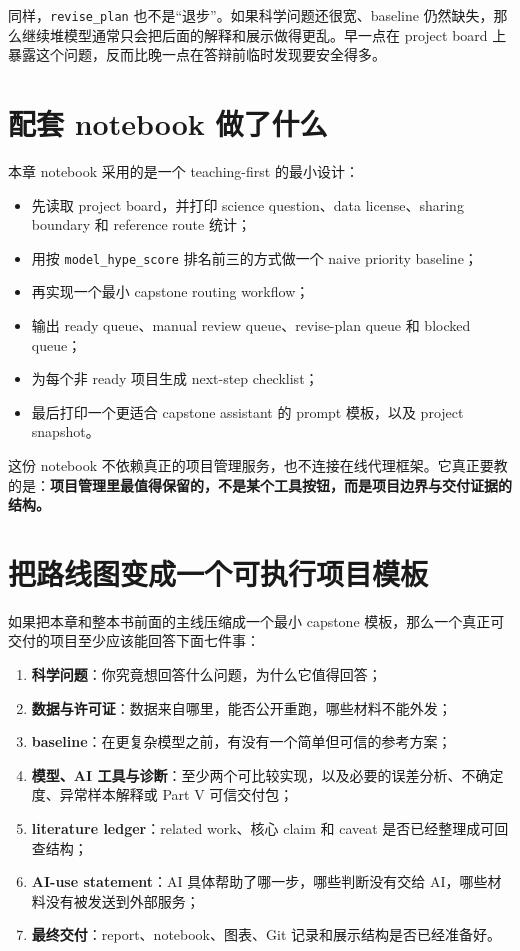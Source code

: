 同样，\texttt{revise\_plan} 也不是“退步”。如果科学问题还很宽、baseline 仍然缺失，那么继续堆模型通常只会把后面的解释和展示做得更乱。早一点在 project board 上暴露这个问题，反而比晚一点在答辩前临时发现要安全得多。

\section{配套 notebook 做了什么}

本章 notebook 采用的是一个 teaching-first 的最小设计：

\begin{itemize}
    \item 先读取 project board，并打印 science question、data license、sharing boundary 和 reference route 统计；
    \item 用按 \texttt{model\_hype\_score} 排名前三的方式做一个 naive priority baseline；
    \item 再实现一个最小 capstone routing workflow；
    \item 输出 ready queue、manual review queue、revise-plan queue 和 blocked queue；
    \item 为每个非 ready 项目生成 next-step checklist；
    \item 最后打印一个更适合 capstone assistant 的 prompt 模板，以及 project snapshot。
\end{itemize}

这份 notebook 不依赖真正的项目管理服务，也不连接在线代理框架。它真正要教的是：\textbf{项目管理里最值得保留的，不是某个工具按钮，而是项目边界与交付证据的结构。}

\section{把路线图变成一个可执行项目模板}

如果把本章和整本书前面的主线压缩成一个最小 capstone 模板，那么一个真正可交付的项目至少应该能回答下面七件事：

\begin{enumerate}
    \item \textbf{科学问题}：你究竟想回答什么问题，为什么它值得回答；
    \item \textbf{数据与许可证}：数据来自哪里，能否公开重跑，哪些材料不能外发；
    \item \textbf{baseline}：在更复杂模型之前，有没有一个简单但可信的参考方案；
    \item \textbf{模型、AI 工具与诊断}：至少两个可比较实现，以及必要的误差分析、不确定度、异常样本解释或 Part V 可信交付包；
    \item \textbf{literature ledger}：related work、核心 claim 和 caveat 是否已经整理成可回查结构；
    \item \textbf{AI-use statement}：AI 具体帮助了哪一步，哪些判断没有交给 AI，哪些材料没有被发送到外部服务；
    \item \textbf{最终交付}：report、notebook、图表、Git 记录和展示结构是否已经准备好。
\end{enumerate}

